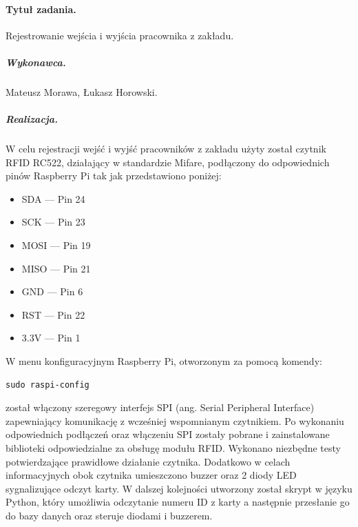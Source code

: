 \documentclass[a4paper]{article}
\begin{document}
\paragraph{Tytuł zadania.} Rejestrowanie wejścia i wyjścia pracownika z zakładu.
\subparagraph{Wykonawca.} Mateusz Morawa, Łukasz Horowski.
\subparagraph{Realizacja.} W celu rejestracji wejść i wyjść pracowników z zakładu użyty został czytnik RFID RC522, działający w standardzie Mifare, podłączony do odpowiednich pinów Raspberry Pi tak jak przedstawiono poniżej:
\begin{itemize}
 \item  SDA   --- Pin 24
 \item  SCK   --- Pin 23
 \item  MOSI  --- Pin 19
 \item  MISO  --- Pin 21
 \item  GND   --- Pin 6
 \item  RST   --- Pin 22
 \item  3.3V  --- Pin 1
\end{itemize}
W  menu konfiguracyjnym Raspberry Pi, otworzonym za pomocą komendy:
\begin{verbatim}
sudo raspi-config
\end{verbatim}
został włączony szeregowy interfejs SPI (ang. Serial Peripheral Interface) zapewniający komunikację z wcześniej wspomnianym czytnikiem. Po wykonaniu odpowiednich podłączeń oraz włączeniu SPI zostały pobrane i zainstalowane biblioteki odpowiedzialne za obsługę modułu RFID. Wykonano niezbędne testy potwierdzające prawidłowe działanie czytnika. Dodatkowo w celach informacyjnych obok czytnika umieszczono buzzer oraz 2 diody LED sygnalizujące odczyt karty. W dalszej kolejności utworzony został skrypt w języku Python, który umożliwia  odczytanie numeru ID z karty a następnie przesłanie go do bazy danych oraz steruje diodami i buzzerem. 
\end{document}
